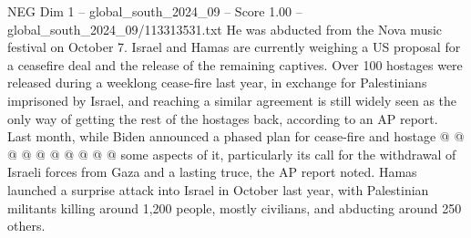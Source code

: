 \begin{textsample}{NEG Dim 1 – global\_south\_2024\_09 – Score 1.00 – global\_south\_2024\_09/113313531.txt}
He was abducted from the Nova music festival on October 7.
Israel and Hamas are currently weighing a US proposal for a ceasefire deal and the release of the remaining captives.
Over 100 hostages were released during a weeklong cease-fire last year, in exchange for Palestinians imprisoned by Israel, and reaching a similar agreement is still widely seen as the only way of getting the rest of the hostages back, according to an AP report.
Last month, while Biden announced a phased plan for cease-fire and hostage @ @ @ @ @ @ @ @ @ @ some aspects of it, particularly its call for the withdrawal of Israeli forces from Gaza and a lasting truce, the AP report noted.
Hamas launched a surprise attack into Israel in October last year, with Palestinian militants killing around 1,200 people, mostly civilians, and abducting around 250 others.

\end{textsample}
